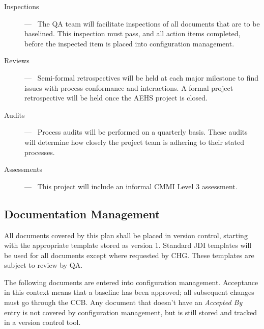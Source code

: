 \documentclass[11pt]{article}
\begin{document}
\begin{description}
\item[Inspections] ---~ The QA team will facilitate inspections of all documents that are to be
  baselined.  This inspection must pass, and all action items completed, before the inspected item
  is placed into configuration management.
\item[Reviews] ---~ Semi-formal retrospectives will be held at each major milestone to find issues
  with process conformance and interactions.  A formal project retrospective will be held once the
  AEHS project is closed.
\item[Audits] ---~ Process audits will be performed on a quarterly basis.  These audits will
  determine how closely the project team is adhering to their stated processes.
\item[Assessments] ---~ This project will include an informal CMMI Level 3 assessment.
\end{description}


\subsection{Documentation Management}
All documents covered by this plan shall be placed in version control, starting with the appropriate
template stored as version 1.  Standard JDI templates will be used for all documents except where
requested by CHG.  These templates are subject to review by QA.

The following documents are entered into configuration management.  Acceptance in this context means
that a baseline has been approved; all subsequent changes must go through the CCB.  Any document
that doesn't have an \textit{Accepted By} entry is not covered by configuration management, but is
still stored and tracked in a version control tool.
\end{document}
